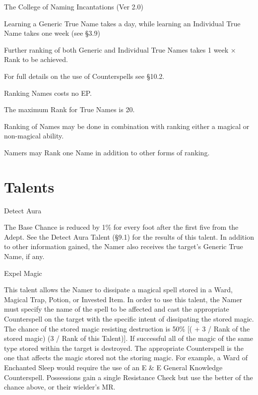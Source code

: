 \begin{Chapter}{The College of Naming Incantations (Ver 2.0)}
\begin{Itemize}
\item Learning a Generic True Name takes a day, while learning an
  Individual True Name takes one week (see §3.9)

\item Further ranking of both Generic and Individual True Names takes
  1 week × Rank to be achieved.
\end{Itemize}

For full details on the use of Counterspells see §10.2.

\begin{Itemize}
\item Ranking Names costs no EP.  
\item The maximum Rank for True Names is 20.  
\item Ranking of Names may be done in combination with ranking either
  a magical or non-magical ability.
\item Namers may Rank one Name in addition to other forms of ranking.
\end{Itemize}


\section{Talents}

\begin{talent}[T-1]{Detect Aura}

\begin{effects}
The Base Chance is reduced by 1\% for every foot after the first five
from the Adept.  See the Detect Aura Talent (§9.1) for the results of
this talent.  In addition to other information gained, the Namer also
receives the target’s Generic True Name, if any.
\end{effects}
\end{talent}

\begin{talent}[T-2]{Expel Magic}

\begin{effects}
This talent allows the Namer to dissipate a magical spell stored in a
Ward, Magical Trap, Potion, or Invested Item. In order to use this
talent, the Namer must specify the name of the spell to be affected
and cast the appropriate Counterspell on the target with the specific
intent of dissipating the stored magic.  The chance of the stored
magic resisting destruction is 50\% [( + 3 / Rank of the stored magic)
  (3 / Rank of this Talent)].  If successful all of the magic of the
same type stored within the target is destroyed.  The appropriate
Counterspell is the one that affects the magic stored not the storing
magic.  For example, a Ward of Enchanted Sleep would require the use
of an E \& E General Knowledge Counterspell. Possessions gain a single
Resistance Check but use the better of the chance above, or their
wielder’s MR.
\end{effects}
\end{talent}


\end{Chapter}
